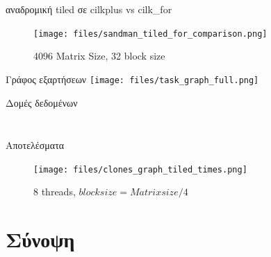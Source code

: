 \documentclass{beamer}
\begin{document}
\begin{frame}
    \begin{block}{αναδρομική tiled σε cilkplus vs cilk\_for}
        \begin{figure}[H]
            \centering
            \texttt{[image: files/sandman\_tiled\_for\_comparison.png]}
            \caption{4096 Matrix Size, 32 block size}
        \end{figure}
    \end{block}
\end{frame}

\begin{frame}{Γράφος εξαρτήσεων}
    \texttt{[image: files/task\_graph\_full.png]}
\end{frame}

\begin{frame}[fragile]{Δομές δεδομένων}
        \begin{minipage}{0.5\textwidth}
            \inputminted[fontsize=\scriptsize,firstline=19,lastline=23]{c}{files/task.h}
        \end{minipage}
       \begin{minipage}{0.4\textwidth}
            \inputminted[fontsize=\scriptsize,firstline=29,lastline=35]{c}{files/task.h}
        \end{minipage}
\end{frame}

\begin{frame}
    \begin{block}{Αποτελέσματα}
        \begin{figure}[H]
            \centering
            \texttt{[image: files/clones\_graph\_tiled\_times.png]}
            \caption{8 threads, $block size = Matrix size /4$}
        \end{figure}
    \end{block}
\end{frame}

\section{Σύνοψη}
\end{document}
